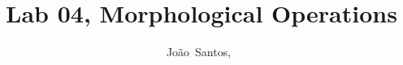 \documentclass[journal]{IEEEtran}
\begin{document}
%
\title{Lab 04, Morphological Operations}
%
%
%

\author{João~Santos,~}


% 
%
\end{document}

